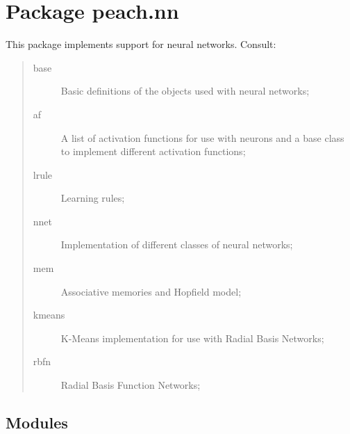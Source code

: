 %
%
%


\section{Package peach.nn}

    \label{peach:nn}

This package implements support for neural networks. Consult:
%
\begin{quote}
%
\begin{description}
\item[{base}] \leavevmode 
Basic definitions of the objects used with neural networks;

\item[{af}] \leavevmode 
A list of activation functions for use with neurons and a base class to
implement different activation functions;

\item[{lrule}] \leavevmode 
Learning rules;

\item[{nnet}] \leavevmode 
Implementation of different classes of neural networks;

\item[{mem}] \leavevmode 
Associative memories and Hopfield model;

\item[{kmeans}] \leavevmode 
K-Means implementation for use with Radial Basis Networks;

\item[{rbfn}] \leavevmode 
Radial Basis Function Networks;

\end{description}

\end{quote}


\subsection{Modules}

